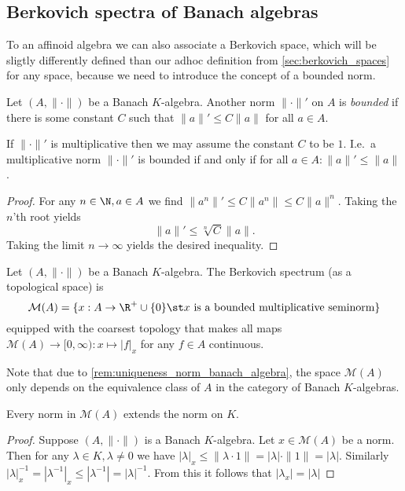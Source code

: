\subsection{Berkovich spectra of Banach algebras} \label{sec:berkovich_spectra_of_banach_algebras}


To an affinoid algebra we can also associate a Berkovich space, which will be sligtly differently defined than our adhoc definition from \cref{sec:berkovich_spaces} for any space, because we need to introduce the concept of a bounded norm.

\begin{definition}
	Let $(A, \|\cdot \|)$ be a Banach $K$-algebra. Another norm $\|\cdot \|'$ on $A$ is \emph{bounded}  if there is some constant $C$ such that  $\|a\|' \le C \|a\|$ for all $a \in A$. 
\end{definition}


\begin{remark}
	If $\|\cdot \|'$ is multiplicative then we may assume the constant $C$ to be $1$. 
	I.e.\ a multiplicative norm $\|\cdot \|'$ is bounded if and only if  for all $a \in A: \|a\|' \le \|a\|$. 
\end{remark}
\begin{proof}
	For any $n \in \N, a \in A$ we find $\|a^{n}\|' \le C \|a^{n}\| \le C \|a\|^{n}$. 
	Taking the $n$'th root yields \[
		\|a\|' \le \sqrt[n]{C} \|a\|
	.\] 
	Taking the limit $n \to \infty$ yields the desired inequality. 
\end{proof}

\begin{definition}\label{def:spectrum_banach_algebra}
	Let $(A, \|\cdot \|)$ be a Banach $K$-algebra. 
	The Berkovich spectrum (as a topological space) is \[
		\mathcal{M} (A) = \{x: A \to\R^{+} \cup \{0\}  \st x \text{ is a bounded multiplicative seminorm}\} 
	\] 
	equipped with the coarsest topology that makes all maps $\mathcal{M} (A) \to [0, \infty): x \mapsto |f|_x$ for any $f \in A$ continuous. 
\end{definition}
Note that due to \cref{rem:uniqueness_norm_banach_algebra}, the space $\mathcal{M} (A)$ only depends on the equivalence class of $A$ in the category of Banach $K$-algebras. 

\begin{proposition}\label{prop:norm_spectrum_extends_base_field}
	Every norm in $\mathcal{M} (A)$ extends the norm on $K$. 
\end{proposition}
\begin{proof}
	Suppose $(A, \|\cdot \|)$ is a Banach $K$-algebra. 
	Let $x \in \mathcal{M} (A)$ be a norm. 
	Then for any $\lambda \in K, \lambda \ne 0$ we have $|\lambda|_x \le  \|\lambda\cdot 1\| = |\lambda| \cdot \|1\| = |\lambda|$. 
	Similarly $|\lambda|_x^{-1} = |\lambda^{-1}|_x  \le |\lambda^{-1}| = |\lambda|^{-1}$. 
	From this it follows that $|\lambda_x| = |\lambda|$
\end{proof}


